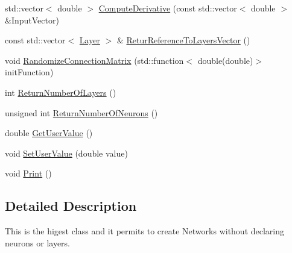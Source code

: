 \begin{DoxyCompactItemize}
\item 
std\-::vector$<$ double $>$ \hyperlink{classneuroc_1_1_network_a0a202ef490107dbe4ec96026f109603f}{Compute\-Derivative} (const std\-::vector$<$ double $>$ \&Input\-Vector)
\item 
const std\-::vector$<$ \hyperlink{classneuroc_1_1_layer}{Layer} $>$ \& \hyperlink{classneuroc_1_1_network_ad8c51835a8173d999afec0952a168bea}{Retur\-Reference\-To\-Layers\-Vector} ()
\item 
void \hyperlink{classneuroc_1_1_network_a76a944722c388191c986fbd806025456}{Randomize\-Connection\-Matrix} (std\-::function$<$ double(double)$>$ init\-Function)
\item 
int \hyperlink{classneuroc_1_1_network_a1a06f001393f19014739a7575a874010}{Return\-Number\-Of\-Layers} ()
\item 
unsigned int \hyperlink{classneuroc_1_1_network_a9c107f2abf03fb886a140eb43860c4d2}{Return\-Number\-Of\-Neurons} ()
\item 
double \hyperlink{classneuroc_1_1_network_a2255d19fd1da7d4e48470539cdbeaa77}{Get\-User\-Value} ()
\item 
void \hyperlink{classneuroc_1_1_network_a415f39e91ca216256d440baa6a4939d4}{Set\-User\-Value} (double value)
\item 
void \hyperlink{classneuroc_1_1_network_a6eb9f5cd7f58ca995b4b86996aa7f9c5}{Print} ()
\end{DoxyCompactItemize}


\subsection{Detailed Description}
This is the higest class and it permits to create Networks without declaring neurons or layers. 

